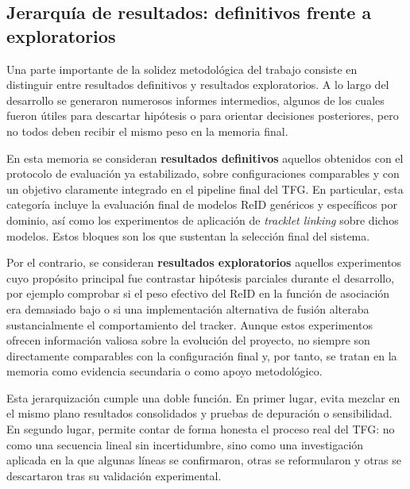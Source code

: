 \documentclass[../MAIN.tex]{subfiles}
\begin{document}
	\subsection{Jerarquía de resultados: definitivos frente a exploratorios}
	\label{sec:definitivos_exploratorios}
	
	Una parte importante de la solidez metodológica del trabajo consiste en distinguir entre resultados definitivos y resultados exploratorios. A lo largo del desarrollo se generaron numerosos informes intermedios, algunos de los cuales fueron útiles para descartar hipótesis o para orientar decisiones posteriores, pero no todos deben recibir el mismo peso en la memoria final.
	
	En esta memoria se consideran \textbf{resultados definitivos} aquellos obtenidos con el protocolo de evaluación ya estabilizado, sobre configuraciones comparables y con un objetivo claramente integrado en el pipeline final del TFG. En particular, esta categoría incluye la evaluación final de modelos ReID genéricos y específicos por dominio, así como los experimentos de aplicación de \textit{tracklet linking} sobre dichos modelos. Estos bloques son los que sustentan la selección final del sistema.
	
	Por el contrario, se consideran \textbf{resultados exploratorios} aquellos experimentos cuyo propósito principal fue contrastar hipótesis parciales durante el desarrollo, por ejemplo comprobar si el peso efectivo del ReID en la función de asociación era demasiado bajo o si una implementación alternativa de fusión alteraba sustancialmente el comportamiento del tracker. Aunque estos experimentos ofrecen información valiosa sobre la evolución del proyecto, no siempre son directamente comparables con la configuración final y, por tanto, se tratan en la memoria como evidencia secundaria o como apoyo metodológico.
	
	Esta jerarquización cumple una doble función. En primer lugar, evita mezclar en el mismo plano resultados consolidados y pruebas de depuración o sensibilidad. En segundo lugar, permite contar de forma honesta el proceso real del TFG: no como una secuencia lineal sin incertidumbre, sino como una investigación aplicada en la que algunas líneas se confirmaron, otras se reformularon y otras se descartaron tras su validación experimental.
	
	\newpage
	
\end{document}
